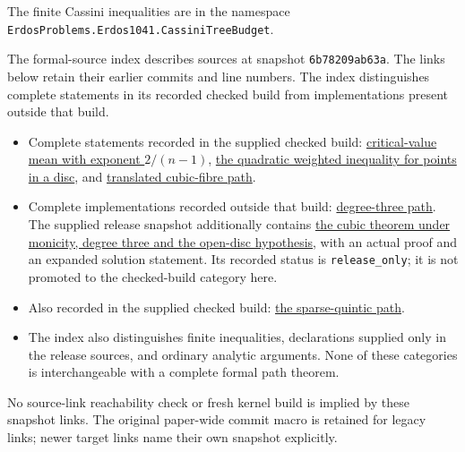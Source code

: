 \documentclass[11pt]{article}
\begin{document}
The finite Cassini inequalities are in the namespace
\nolinkurl{ErdosProblems.Erdos1041.CassiniTreeBudget}.


The formal-source index describes sources at snapshot \texttt{6b78209ab63a}.
The links below retain their earlier commits and line numbers. The index
distinguishes complete statements in its recorded checked build from
implementations present outside that build.
\begin{itemize}
\item Complete statements recorded in the supplied checked build: \href{https://github.com/wcook04/plectis-erdos/blob/3d6d938d696fed0fb71dd55115a18a73738ff223/lean/ErdosProblems/Erdos1041/PaperCriticalValueMeanR10.lean#L101}{critical-value mean with exponent $2/(n-1)$}, \href{https://github.com/wcook04/plectis-erdos/blob/3d6d938d696fed0fb71dd55115a18a73738ff223/lean/ErdosProblems/Erdos1041/PaperWeightedRefinementsR10.lean#L17}{the quadratic weighted inequality for points in a disc}, and \href{https://github.com/wcook04/plectis-erdos/blob/3d6d938d696fed0fb71dd55115a18a73738ff223/lean/ErdosProblems/Erdos1041/PaperCubicFibres.lean#L240}{translated cubic-fibre path}.
\item Complete implementations recorded outside that build: \href{https://github.com/wcook04/plectis-erdos/blob/3d6d938d696fed0fb71dd55115a18a73738ff223/lean/ErdosProblems/Erdos1041/PaperCubicCompletion.lean#L297}{degree-three path}.
The supplied release snapshot additionally contains \href{https://github.com/wcook04/plectis-erdos-lean/blob/52f29ad173b04e3bac941b3663f2b9aebe5de0bb/ErdosProblems/Erdos1041/PaperCubicMonic.lean#L32}{the cubic theorem under monicity, degree three and the open-disc hypothesis},
with an actual proof and an expanded solution statement. Its recorded
status is \texttt{release\_only}; it is not promoted to the checked-build
category here.
\item Also recorded in the supplied checked build: \href{https://github.com/wcook04/plectis-erdos/blob/3d6d938d696fed0fb71dd55115a18a73738ff223/lean/ErdosProblems/Erdos1041/PaperPrimitiveCompletionR10.lean#L235}{the sparse-quintic path}.
\item The index also distinguishes finite inequalities, declarations supplied
only in the release sources, and ordinary analytic arguments. None of these
categories is interchangeable with a complete formal path theorem.
\end{itemize}
No source-link reachability check or fresh kernel build is implied by these
snapshot links.  The original paper-wide commit macro is retained for legacy
links; newer target links name their own snapshot explicitly.
\end{document}
